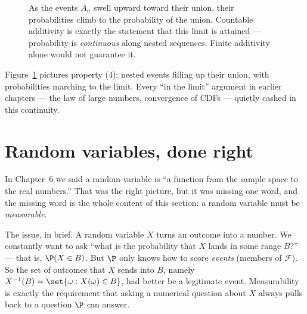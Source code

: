 \begin{figure}[H]
\centering
{}
\caption{As the events $A_n$ swell upward toward their union, their probabilities
climb to the probability of the union. Countable additivity is exactly the
statement that this limit is attained --- probability is \emph{continuous} along
nested sequences. Finite additivity alone would not guarantee it.}
\label{ch36:fig-continuity}
\end{figure}

Figure~\ref{ch36:fig-continuity} pictures property (4): nested events filling up
their union, with probabilities marching to the limit. Every ``in the limit''
argument in earlier chapters --- the law of large numbers, convergence of CDFs ---
quietly cashed in this continuity.

\section{Random variables, done right}
\label{ch36:random-variables}

In Chapter~6 we said a random variable is ``a function from the sample space to
the real numbers.'' That was the right picture, but it was missing one word, and
the missing word is the whole content of this section: a random variable must be
\emph{measurable}.

\begin{intuitionbox}
The issue, in brief. A random variable $X$ turns an outcome into a
number. We constantly want to ask ``what is the probability that $X$ lands in some
range $B$?'' --- that is, $\P(X \in B)$. But $\P$ only knows how to score
\emph{events} (members of $\mathcal{F}$). So the set of outcomes that $X$ sends
into $B$, namely $X^{-1}(B) = \set{\omega : X(\omega) \in B}$, had better be a
legitimate event. Measurability is exactly the requirement that asking a numerical
question about $X$ always pulls back to a question $\P$ can answer.
\end{intuitionbox}

